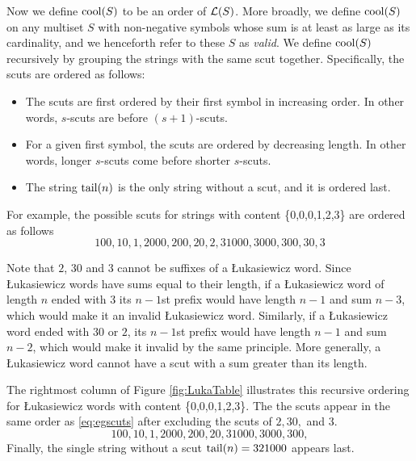Now we define $\operatorname{cool}(S)$ to be an order of $\mathcal{L}(S)$.
More broadly, we define $\operatorname{cool}(S)$ on any multiset $S$ with non-negative symbols whose sum is at least as large as its cardinality, and we henceforth refer to these $S$ as \emph{valid}.
We define $\operatorname{cool}(S)$ recursively by grouping the strings with the same scut together.
Specifically, the scuts are ordered as follows:
\begin{itemize}
    \item The scuts are first ordered by their first symbol in increasing order.
    In other words, $s$-scuts are before $(s+1)$-scuts.
    \item For a given first symbol, the scuts are ordered by decreasing length.
    In other words, longer $s$-scuts come before shorter $s$-scuts.
    \item The string $\operatorname{tail}(n)$ is the only string without a scut, and it is ordered last.
\end{itemize}


For example, 
the possible scuts for strings with content \{0,0,0,1,2,3\} are ordered as follows
\begin{equation} \label{eq:egscuts}
100, 10, 1, 2000, 200, 20, 2, 31000, 3000, 300, 30, 3
\end{equation}

Note that $2$, $30$ and $3$ cannot be suffixes of a Łukasiewicz word. Since Łukasiewicz words have sums equal to their length, if a Łukasiewicz word of length $n$ ended with $3$ its $n-1$st prefix would have length $n-1$ and sum $n-3$, which would make it an invalid Łukasiewicz word. Similarly, if a Łukasiewicz word ended with $30$ or $2$, its $n-1$st prefix would have length $n-1$ and sum $n-2$, which would make it invalid by the same principle.  More generally, a Łukasiewicz word cannot have a scut with a sum greater than its length.

The rightmost column of Figure \ref{fig:LukaTable} illustrates this recursive ordering for Łukasiewicz words with content \{0,0,0,1,2,3\}.
The the scuts appear in the same order as \eqref{eq:egscuts} after excluding the scuts of $2, 30,$ and $3$.
\begin{equation} \label{eq:scuts}
100, 10, 1, 2000, 200, 20, 31000, 3000, 300,    
\end{equation}
Finally, the single string without a scut $\operatorname{tail}(n) = 321000$ appears last.

